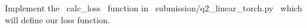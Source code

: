 \item {}
Implement the ~calc_loss~ function in ~submission/q2_linear_torch.py~ which will define our loss function.
